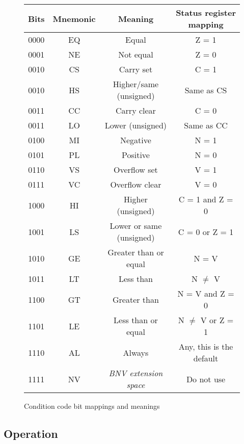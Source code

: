 \documentclass[a4paper,twoside]{book}
\begin{document}
        \begin{figure}[h]
          \begin{tabular}{c c c c}
            Bits & Mnemonic & Meaning            & Status register mapping\\
            \hline
            0000 & EQ & Equal                    & Z = 1\\
            0001 & NE & Not equal                & Z = 0\\
            0010 & CS & Carry set                & C = 1\\
            0010 & HS & Higher/same (unsigned)   & Same as CS\\
            0011 & CC & Carry clear              & C = 0\\
            0011 & LO & Lower (unsigned)         & Same as CC\\
            0100 & MI & Negative                 & N = 1\\
            0101 & PL & Positive                 & N = 0\\
            0110 & VS & Overflow set             & V = 1\\
            0111 & VC & Overflow clear           & V = 0\\
            1000 & HI & Higher (unsigned)        & C = 1 and Z = 0\\
            1001 & LS & Lower or same (unsigned) & C = 0 or Z = 1\\
            1010 & GE & Greater than or equal    & N = V\\
            1011 & LT & Less than                & N $\ne$ V\\
            1100 & GT & Greater than             & N = V and Z = 0\\
            1101 & LE & Less than or equal       & N $\ne$ V or Z = 1\\
            1110 & AL & Always                   & Any, this is the default\\
            1111 & NV & \emph{BNV extension space} & Do not use\\
          \end{tabular}
          \caption{Condition code bit mappings and meanings}
        \end{figure}
        
      
      \subsection*{Operation}
      
\end{document}
